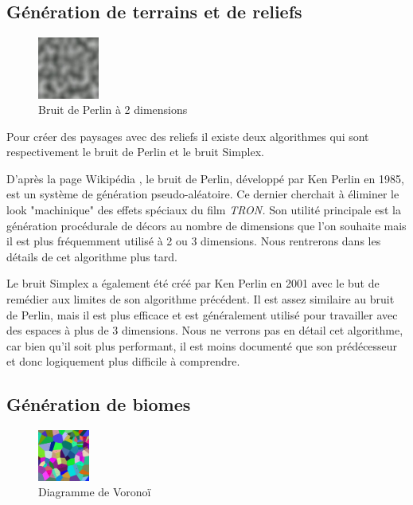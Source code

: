 \documentclass[12pt]{article}
\begin{document}
\subsection{Génération de terrains et de reliefs}

\begin{figure} %
  \centering
  \includegraphics[width=0.18\textwidth]{assets/Perlin_noise.jpg}
  \caption{Bruit de Perlin à 2 dimensions}
  \label{perlin}
\end{figure}

Pour créer des paysages avec des reliefs il existe deux algorithmes qui sont respectivement le bruit de Perlin et le bruit Simplex.\par
D'après la page Wikipédia \cite{perlin}, le bruit de Perlin, développé par Ken Perlin en 1985, est un système de génération pseudo-aléatoire. Ce dernier cherchait à éliminer le look "machinique" des effets spéciaux du film \textit{TRON.} Son utilité principale est la génération procédurale de décors au nombre de dimensions que l'on souhaite mais il est plus fréquemment utilisé à 2 ou 3 dimensions. Nous rentrerons dans les détails de cet algorithme plus tard.\par
Le bruit Simplex \cite{simplex_noise} a également été créé par Ken Perlin en 2001 avec le but de remédier aux limites de son algorithme précédent. Il est assez similaire au bruit de Perlin, mais il est plus efficace et est généralement utilisé pour travailler avec des espaces à plus de 3 dimensions. Nous ne verrons pas en détail cet algorithme, car bien qu'il soit plus performant, il est moins documenté que son prédécesseur et donc logiquement plus difficile à comprendre.
\vspace{1cm}
\subsection{Génération de biomes}

\begin{figure} %
  \centering
  \includegraphics[width=0.15\textwidth]{assets/voronoi.png}
  \caption{Diagramme de Voronoï}
  \label{voronoi}
\end{figure}
\end{document}
